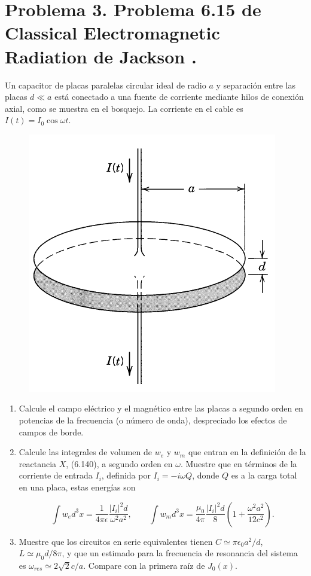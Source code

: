 \documentclass[a4paper,11pt]{article}
\numberwithin{equation}{section}
\begin{document}
\newpage

\section{Problema 3. Problema 6.15 de Classical Electromagnetic Radiation
de Jackson \cite{jackson}.}

Un capacitor de placas paralelas circular ideal de radio $a$ y separación entre 
las placas $d \ll a$ está conectado a una fuente de corriente mediante hilos de 
conexión axial, como se muestra en el bosquejo. La corriente en el cable es 
$I(t) = I_0\cos{\omega t}$.

\begin{figure}[H]
 \center 
 \includegraphics[scale=0.5]{problema3fig1}
\end{figure}

\begin{enumerate}[label=\textbf{(\alph*)}]
\item Calcule el campo eléctrico y el magnético entre las placas a segundo orden 
en potencias de la frecuencia (o número de onda), despreciado los efectos de campos 
de borde.
\item Calcule las integrales de volumen de $w_e$ y $w_m$ que entran en la definición 
de la reactancia $X$, (6.140), a segundo orden en $\omega$. Muestre que en términos 
de la corriente de entrada $I_i$, definida por $I_i = - i\omega Q$, donde $Q$ es 
a la carga total en una placa, estas energías son 

$$
\int w_e d^3x = \frac{1}{4\pi\epsilon}\frac{|I_i|^2d}{\omega^2 a^2}, \qquad 
\int w_m d^3x = \frac{\mu_0}{4\pi}\frac{|I_i|^2d}{8}\left(1 +
\frac{\omega^2 a^2}{12c^2} \right).
$$
\item Muestre que los circuitos en serie equivalentes tienen $C \simeq \pi\epsilon_0 
a^2/d$, $L \simeq \mu_0d/8\pi$, y que un estimado para la frecuencia de resonancia 
del sistema es $\omega_{res} \simeq 2\sqrt{2}c/a$. Compare con la primera raíz 
de $J_0(x)$.
\end{enumerate}
\end{document}
